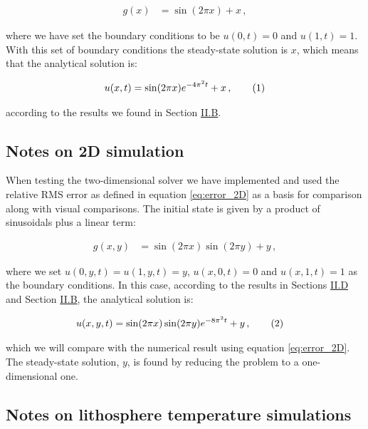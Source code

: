 \documentclass[reprint,english,notitlepage]{revtex4-1}  %
\newcommand\numberthis{\addtocounter{equation}{1}\tag{\theequation}}
\begin{document}
\begin{align*}
g(x) &= \sin ( 2\pi x) + x \, ,
\end{align*}

where we have set the boundary conditions to be $u(0,t) = 0$ and $u(1,t) = 1$. With this set of boundary conditions the steady-state solution is $x$, which means that the analytical solution is:

\begin{align*}
u(x,t) = \sin(2\pi x)e^{-4\pi^2 t} + x \, , \numberthis \label{eq:analytical_1D}
\end{align*} 

according to the results we found in Section \hyperref[sec:formalism_1D_diff_eq_analytical]{II.B}.


\subsection{Notes on 2D simulation} \label{sec:method_2D_sim}

When testing the two-dimensional solver we have implemented and used the relative RMS error as defined in equation \eqref{eq:error_2D} as a basis for comparison along with visual comparisons. The initial state is given by a product of sinusoidals plus a linear term:

\begin{align*}
g(x,y) &= \sin(2\pi x) \sin (2\pi y) + y \, ,
\end{align*}

where we set $u(0,y,t) = u(1,y,t) = y$, $u(x,0,t) = 0$ and $u(x,1,t) = 1$ as the boundary conditions. In this case, according to the results in Sections \hyperref[sec:formalism_2D_diff_eq_analytical]{II.D} and Section \hyperref[sec:formalism_1D_diff_eq_analytical]{II.B}, the analytical solution is:

\begin{align*}
u(x,y,t) &= \sin(2\pi x) \sin(2\pi y) e^{-8\pi^2 t} + y \, , \numberthis \label{eq:analytical_2D}
\end{align*}

which we will compare with the numerical result using equation \eqref{eq:error_2D}. The steady-state solution, $y$, is found by reducing the problem to a one-dimensional one.


\subsection{Notes on lithosphere temperature simulations} \label{sec:method_heat_sim}
\end{document}
